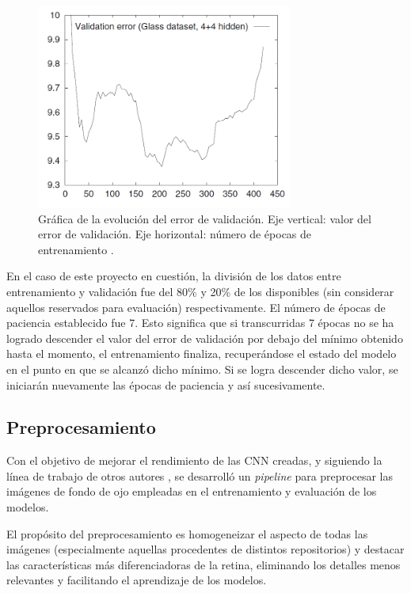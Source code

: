 \begin{figure}[h]
    \centering
    \includegraphics[width=0.75\textwidth]{img/validacion error.png}
    \caption{Gráfica de la evolución del error de validación. Eje vertical: valor del error de validación. Eje horizontal: número de épocas de entrenamiento \cite{early:butwhen}.}
    \label{fig:validacion}
\end{figure}

En el caso de este proyecto en cuestión, la división de los datos entre entrenamiento y validación fue del 80\% y 20\% de los disponibles (sin considerar aquellos reservados para evaluación) respectivamente. El número de épocas de paciencia establecido fue 7. Esto significa que si transcurridas 7 épocas no se ha logrado descender el valor del error de validación por debajo del mínimo obtenido hasta el momento, el entrenamiento finaliza, recuperándose el estado del modelo en el punto en que se alcanzó dicho mínimo. Si se logra descender dicho valor, se iniciarán nuevamente las épocas de paciencia y así sucesivamente.

\subsection{Preprocesamiento}

Con el objetivo de mejorar el rendimiento de las CNN creadas, y siguiendo la línea de trabajo de otros autores \cite{preproc:detection, preproc:maison}, se desarrolló un \textit{pipeline} para preprocesar las imágenes de fondo de ojo empleadas en el entrenamiento y evaluación de los modelos.

El propósito del preprocesamiento es homogeneizar el aspecto de todas las imágenes (especialmente aquellas procedentes de distintos repositorios) y destacar las características más diferenciadoras de la retina, eliminando los detalles menos relevantes y facilitando el aprendizaje de los modelos. 

